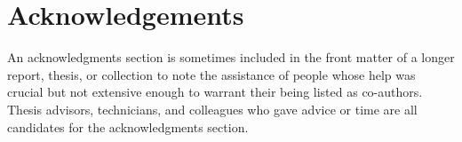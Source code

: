 \chapter*{Acknowledgements}
An acknowledgments section is sometimes included in the front matter
of a longer report, thesis, or collection to note the assistance of
people whose help was crucial but not extensive enough to warrant
their being listed as co-authors. Thesis advisors, technicians, and
colleagues who gave advice or time are all candidates for the
acknowledgments section.
